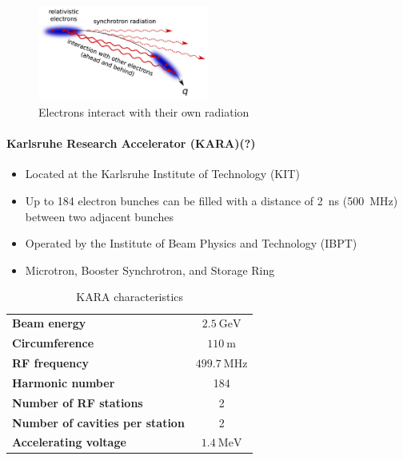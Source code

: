 \begin{figure}[tbh]
	\centering
	\includegraphics[width = 0.5\textwidth]{chap/02-theory/img/microbunching}
	\caption{Electrons interact with their own radiation \cite{Bielawski2019}}
	\label{fig:microBunch}
\end{figure}

\paragraph{Karlsruhe Research Accelerator (KARA)(?)}
\begin{itemize}[noitemsep]
	\item Located at the Karlsruhe Institute of Technology (KIT)
	\item Up to 184 electron bunches can be filled with a distance of \SI{2}{\nano\second} (\SI{500}{\mega\hertz}) between two adjacent bunches %
	\item Operated by the Institute of Beam Physics and Technology (IBPT)
	\item Microtron, Booster Synchrotron, and Storage Ring
\end{itemize}

\begin{table}[tbh]
	\caption{KARA characteristics}
	\label{tab:kara}
	\begin{minipage}{\textwidth}
		\centering
		\begin{tabularx}{\textwidth}{XS}
			\toprule
			\textbf{Beam energy}     				& $ \SI{2.5}{\giga \electronvolt}$ \\
			\textbf{Circumference} 	 				& $\SI{110}{\meter}$	  \\
			\textbf{RF frequency }   				& $\SI{499.7}{\mega \hertz}$ 	\\
			\textbf{Harmonic number} 				& 184	\\
			\textbf{Number of RF stations} 			& 2 \\
			\textbf{Number of cavities per station} 	& 2	\\
			\textbf{Accelerating voltage} 					& $\SI{1.4}{\mega \electronvolt}$ \\
			\bottomrule		\end{tabularx}
	\end{minipage}
\end{table}




